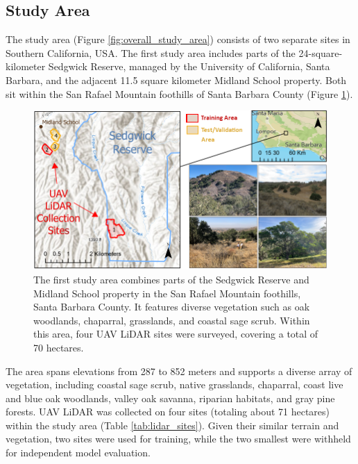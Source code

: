 \documentclass[preprints,article,accept,pdftex,moreauthors]{Definitions/mdpi}
\begin{document}
\subsection{Study Area}


The study area (Figure \ref{fig:overall_study_area}) consists of two separate sites in Southern California, USA.
The first study area includes parts of the 24-square-kilometer Sedgwick Reserve, managed by the University of California, Santa Barbara, and the adjacent 11.5 square kilometer Midland School property. Both sit within the San Rafael Mountain foothills of Santa Barbara County (Figure \ref{fig:sedgwick_study_area}). 


\begin{figure}
  \centering
  \includegraphics[width=1\linewidth]{manuscript/figures/Sedgwick_Reserve_Study_Area.png}
    \caption{The first study area combines parts of the Sedgwick Reserve and Midland School property in the San Rafael Mountain foothills, Santa Barbara County. It features diverse vegetation such as oak woodlands, chaparral, grasslands, and coastal sage scrub. Within this area, four UAV LiDAR sites were surveyed, covering a total of 70 hectares.}
  \label{fig:sedgwick_study_area}
\end{figure}
The area spans elevations from 287 to 852 meters and supports a diverse array of vegetation, including coastal sage scrub, native grasslands, chaparral, coast live and blue oak woodlands, valley oak savanna, riparian habitats, and gray pine forests. UAV LiDAR was collected on four sites (totaling about 71 hectares) within the study area (Table \ref{tab:lidar_sites}). Given their similar terrain and vegetation, two sites were used for training, while the two smallest were withheld for independent model evaluation.
\end{document}
